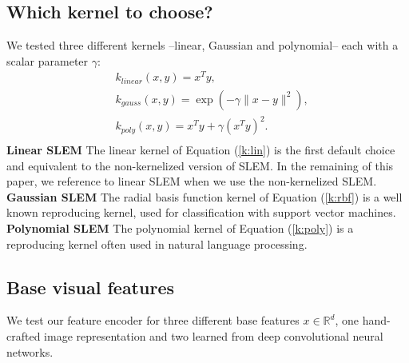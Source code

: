 \subsection{Which kernel to choose?}
We tested three different kernels --linear, Gaussian and polynomial-- each with a scalar parameter $\gamma$:
\begin{align}
    &k_{linear}(x,y) = x^Ty, \label{k:lin}\\
    &k_{gauss}(x,y) = \exp(-\gamma\|x-y \|^2), \label{k:rbf}\\
    &k_{poly}(x,y) = x^Ty+\gamma(x^Ty)^2. \label{k:poly}\\
\end{align}
\textbf{Linear SLEM} The linear kernel of Equation (\ref{k:lin}) is the first default choice and equivalent to the non-kernelized version of SLEM.
In the remaining of this paper, we reference to linear SLEM when we use the non-kernelized SLEM.
\textbf{Gaussian SLEM} The radial basis function kernel of Equation (\ref{k:rbf}) is a
well known reproducing kernel, used for classification with support vector machines.
\textbf{Polynomial SLEM} The polynomial kernel of Equation (\ref{k:poly}) is a reproducing kernel often used in natural language processing. 


\subsection{Base visual features}
We test our feature encoder for three different base features $x\in\mathbb{R}^d$, one hand-crafted image representation and two learned from deep convolutional neural networks.


